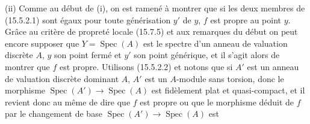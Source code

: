 (ii) Comme au début de (i), on est ramené à montrer que si les deux membres de (15.5.2.1) sont égaux pour toute générisation $y'$ de $y$, $f$ est propre au point $y$. Grâce au critère de propreté locale (15.7.5) et aux remarques du début on peut encore supposer que $Y=\operatorname{Spec}(A)$ est le spectre d'un anneau de valuation discrète $A$, $y$ son point fermé et $y'$ son point générique, et il s'agit alors de montrer que $f$ est propre. Utilisons (15.5.2.2) et notons que si $A'$ est un anneau de valuation discrète dominant $A$, $A'$ est un $A$-module sans torsion, donc le morphisme $\operatorname{Spec}(A')\to\operatorname{Spec}(A)$ est fidèlement plat et quasi-compact, et il revient donc au même de dire que $f$ est propre ou que le morphisme déduit de $f$ par le changement de base $\operatorname{Spec}(A')\to\operatorname{Spec}(A)$ est

